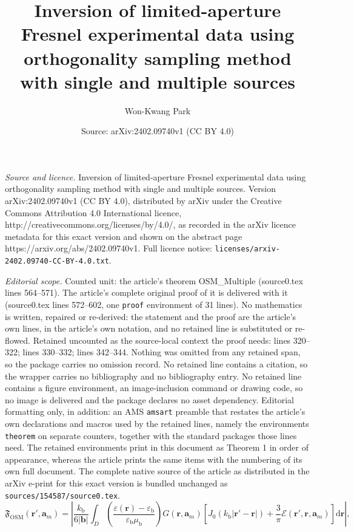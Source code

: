 \documentclass[10pt,a4paper]{amsart}
\title{Inversion of limited-aperture Fresnel experimental data using orthogonality sampling method with single and multiple sources}
\author{Won-Kwang Park}
\date{Source: arXiv:2402.09740v1 (CC BY 4.0)}
\newcommand{\eps}{\varepsilon}
\newcommand{\epsb}{\varepsilon_{\mathrm{b}}}
\newcommand{\kb}{k_{\mathrm{b}}}
\newcommand{\ma}{\mathbf{a}}
\newcommand{\mb}{\mathbf{b}}
\newcommand{\mr}{\mathbf{r}}
\newcommand{\mub}{\mu_{\mathrm{b}}}
\DeclareMathOperator*{\osm}{OSM}
\newcommand{\rd}{\mathrm{d}}
\begin{document}
\maketitle

\noindent\emph{Source and licence.} Inversion of limited-aperture Fresnel experimental data using orthogonality sampling method with single and multiple sources. Version arXiv:2402.09740v1 (CC BY 4.0), distributed by arXiv under the Creative Commons Attribution 4.0 International licence, http://creativecommons.org/licenses/by/4.0/, as recorded in the arXiv licence metadata for this exact version and shown on the abstract page https://arxiv.org/abs/2402.09740v1. Full licence notice: \texttt{licenses/arxiv-2402.09740-CC-BY-4.0.txt}.\par\smallskip

\noindent\textit{Editorial scope.} Counted unit: the article's theorem OSM\_Multiple (source0.tex lines 564--571). The article's complete original proof of it is delivered with it (source0.tex lines 572--602, one \texttt{proof} environment of 31 lines). No mathematics is written, repaired or re-derived: the statement and the proof are the article's own lines, in the article's own notation, and no retained line is substituted or re-flowed.  Retained uncounted as the source-local context the proof needs: lines 320--322; lines 330--332; lines 342--344.  Nothing was omitted from any retained span, so the package carries no omission record.  No retained line contains a citation, so the wrapper carries no bibliography and no bibliography entry.  No retained line contains a figure environment, an image-inclusion command or drawing code, so no image is delivered and the package declares no asset dependency.  Editorial formatting only, in addition: an AMS \texttt{amsart} preamble that restates the article's own declarations and macros used by the retained lines, namely the environments \texttt{theorem} on separate counters, together with the standard packages those lines need.  The retained environments print in this document as Theorem 1 in order of appearance, whereas the article prints the same items with the numbering of its own full document.  The complete native source of the article as distributed in the arXiv e-print for this exact version is bundled unchanged as \texttt{sources/154587/source0.tex}.
  \begin{equation}\label{Structure_Single}
    \mathfrak{F}_{\osm}(\mr',\ma_m)=\left|\frac{\kb}{6|\mb|}\int_D\left(\frac{\eps(\mr)-\epsb}{\epsb\mub}\right)G(\mr,\ma_m)\left[J_0(\kb|\mr'-\mr|)+\frac{3}{\pi}\mathcal{E}(\mr',\mr,\ma_m)\right]\rd\mr\right|,
  \end{equation}
\end{document}
